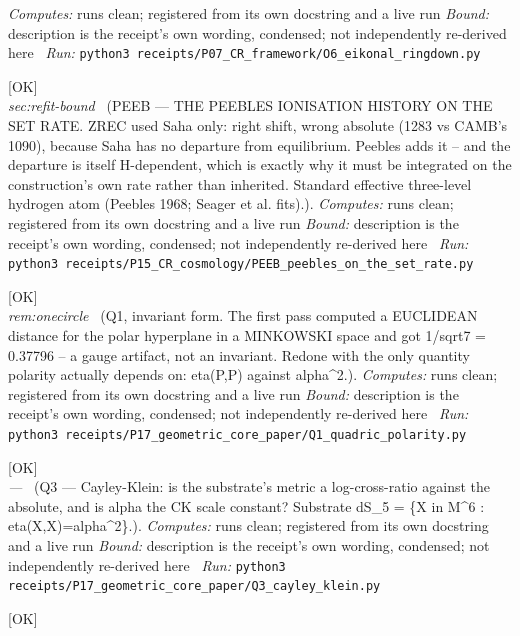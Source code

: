 \begin{description}
\emph{Computes:} runs clean; registered from its own docstring and a live run
 \emph{Bound:} description is the receipt's own wording, condensed; not independently re-derived here
\ \emph{Run:} \texttt{python3 receipts/P07\_CR\_framework/O6\_eikonal\_ringdown.py}
\item[\label{rcpt:PEEB_peebles_on_the_set_rate}\texttt{PEEB\_peebles\_on\_the\_set\_rate}]\hfill\textsf{[OK]}\\
\textit{sec:refit-bound} \ (PEEB --- THE PEEBLES IONISATION HISTORY ON THE SET RATE. ZREC used Saha only: right shift, wrong absolute (1283 vs CAMB's 1090), because Saha has no departure from equilibrium. Peebles adds it -- and the departure is itself H-dependent, which is exactly why it must be integrated on the construction's own rate rather than inherited. Standard effective three-level hydrogen atom (Peebles 1968; Seager et al. fits).). 
\emph{Computes:} runs clean; registered from its own docstring and a live run
 \emph{Bound:} description is the receipt's own wording, condensed; not independently re-derived here
\ \emph{Run:} \texttt{python3 receipts/P15\_CR\_cosmology/PEEB\_peebles\_on\_the\_set\_rate.py}
\item[\label{rcpt:Q1_quadric_polarity}\texttt{Q1\_quadric\_polarity}]\hfill\textsf{[OK]}\\
\textit{rem:onecircle} \ (Q1, invariant form. The first pass computed a EUCLIDEAN distance for the polar hyperplane in a MINKOWSKI space and got 1/sqrt7 = 0.37796 -- a gauge artifact, not an invariant. Redone with the only quantity polarity actually depends on: eta(P,P) against alpha\textasciicircum{}2.). 
\emph{Computes:} runs clean; registered from its own docstring and a live run
 \emph{Bound:} description is the receipt's own wording, condensed; not independently re-derived here
\ \emph{Run:} \texttt{python3 receipts/P17\_geometric\_core\_paper/Q1\_quadric\_polarity.py}
\item[\label{rcpt:Q3_cayley_klein}\texttt{Q3\_cayley\_klein}]\hfill\textsf{[OK]}\\
\textit{---} \ (Q3 --- Cayley-Klein: is the substrate's metric a log-cross-ratio against the absolute, and is alpha the CK scale constant? Substrate dS\_5 = \{X in M\textasciicircum{}6 : eta(X,X)=alpha\textasciicircum{}2\}.). 
\emph{Computes:} runs clean; registered from its own docstring and a live run
 \emph{Bound:} description is the receipt's own wording, condensed; not independently re-derived here
\ \emph{Run:} \texttt{python3 receipts/P17\_geometric\_core\_paper/Q3\_cayley\_klein.py}
\item[\label{rcpt:Q4_equianharmonic_vantages}\texttt{Q4\_equianharmonic\_vantages}]\hfill\textsf{[OK]}\\

\end{description}
